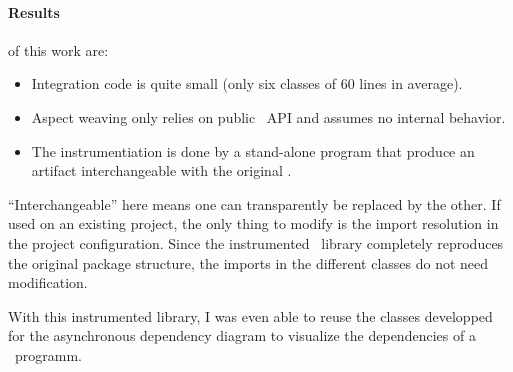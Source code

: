 \paragraph{Results} of this work are:
\begin{itemize}
\item Integration code is quite small (only six classes of 60 lines in average).
\item Aspect weaving only relies on public \vertx\ API and assumes no internal behavior.
\item The instrumentiation is done by a stand-alone program that produce an artifact interchangeable with the original \vertx.
\end{itemize}

``Interchangeable'' here means one can transparently be replaced by the other. If used on an existing project, the only thing to modify is the import resolution in the project configuration. Since the instrumented \vertx\ library completely reproduces the original package structure, the imports in the different classes do not need modification.

With this instrumented library, I was even able to reuse the classes developped for the asynchronous dependency diagram to visualize the dependencies of a \vertx\ programm.


